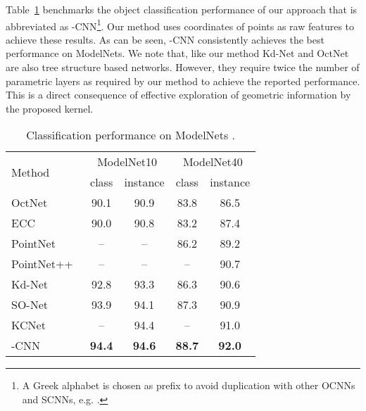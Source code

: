 \documentclass[10pt,twocolumn,letterpaper]{article}
\begin{document}
{Table~\ref{compare2Others} benchmarks the object classification performance of our approach that is abbreviated as -CNN\footnote{A Greek alphabet is chosen as prefix to avoid duplication with other OCNNs and SCNNs, e.g. \cite{liu2015sparse,parashar2017scnn,wang2017cnn}.}.  Our method uses  coordinates of points as raw features to achieve these results.
As can be seen, -CNN consistently achieves the best performance on ModelNets. 
We note that, like our method Kd-Net \cite{klokov2017escape} and OctNet \cite{riegler2017octnet} are also tree structure based networks. However, they require twice the number of parametric layers as required by our method to achieve the reported performance. 
This is a direct consequence of effective exploration of geometric information by the proposed kernel. 


\begin{table}[t]
\centering
\caption{Classification performance on ModelNets \cite{wu20153d}.}\label{compare2Others}
\begin{tabular}{l|c|c|c|c}
  \hline
\multirow{ 2}{*}{Method}&  \multicolumn{2}{c|}{ModelNet10} & \multicolumn{2}{c}{ModelNet40} \\
  \cline{2-5}
&class & instance & class & instance \\
  \hline
  \hline
  OctNet~\cite{riegler2017octnet} &90.1 & 90.9 & 83.8 & 86.5 \\
  ECC~\cite{simonovsky2017dynamic}&90.0&90.8 & 83.2&87.4\\
  PointNet~\cite{qi2017pointnet} & -- & -- & 86.2 &89.2 \\
  PointNet++~\cite{qi2017pointnetplusplus}& -- & -- & --  &90.7 \\
Kd-Net~\cite{klokov2017escape} & 92.8 &93.3 &86.3 &90.6\\
SO-Net~\cite{li2018so}&93.9 &94.1 &87.3 &90.9 \\
  KCNet~\cite{shen2018mining} &--& 94.4 &--& 91.0\\
  \hline
-CNN &  \textbf{94.4} & \textbf{94.6} & \textbf{88.7}  & \textbf{92.0}  \\
\hline
\end{tabular}
\vspace{-3mm}
\end{table}

}
\end{document}
